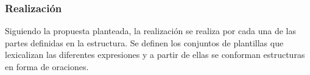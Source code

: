 \pagebreak

\subsubsection{Realización}

%
%

    Siguiendo la propuesta planteada, la realización se realiza por cada una de las partes definidas en la estructura. Se definen los conjuntos de 
plantillas que lexicalizan las diferentes expresiones y a partir de ellas se conforman estructuras en forma de oraciones.
\\

